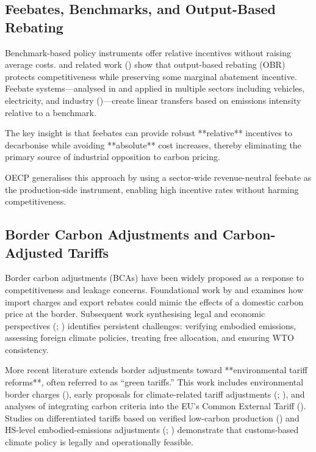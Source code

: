 \documentclass[12pt]{article}
\begin{document}
\subsection{Feebates, Benchmarks, and Output-Based Rebating}

Benchmark-based policy instruments offer relative incentives without raising average
costs.  
\textcite{FischerFox2012} and related work (\textcite{Fischer2019})  
show that output-based rebating (OBR) protects competitiveness while  
preserving some marginal abatement incentive.  
Feebate systems—analysed in \textcite{BoehringerLange2005} and  
applied in multiple sectors including vehicles, electricity, and industry  
(\textcite{HollandMansurYates2020})—create linear transfers based on  
emissions intensity relative to a benchmark.

The key insight is that feebates can provide robust **relative** incentives to
decarbonise while avoiding **absolute** cost increases, thereby eliminating the 
primary source of industrial opposition to carbon pricing.

OECP generalises this approach by using a sector-wide revenue-neutral feebate
as the production-side instrument, enabling high incentive rates without harming 
competitiveness.

\subsection{Border Carbon Adjustments and Carbon-Adjusted Tariffs}

Border carbon adjustments (BCAs) have been widely proposed as a response to
competitiveness and leakage concerns.  
Foundational work by \textcite{IsmerNeuhoff2007} and  
\textcite{MattooSubramanian2009} examines how import charges and export rebates 
could mimic the effects of a domestic carbon price at the border.  
Subsequent work synthesising legal and economic perspectives  
(\textcite{Mehling2019}; \textcite{DroegeFischer2020})  
identifies persistent challenges:  
verifying embodied emissions, assessing foreign climate policies,  
treating free allocation, and ensuring WTO consistency.

More recent literature extends border adjustments toward **environmental tariff
reforms**, often referred to as “green tariffs.”  
This work includes environmental border charges  
(\textcite{LockwoodWhalley2008}), early proposals for  
climate-related tariff adjustments (\textcite{Low2008}; \textcite{Pauwlyn2007}),  
and analyses of integrating carbon criteria into the EU’s  
Common External Tariff (\textcite{Colares2014}).  
Studies on differentiated tariffs based on verified low-carbon production  
(\textcite{ElectriciteDeFrance2019}) and HS-level embodied-emissions adjustments  
(\textcite{MoranWood2020}; \textcite{Brandi2023})  
demonstrate that customs-based climate policy is legally and operationally feasible.
\end{document}
